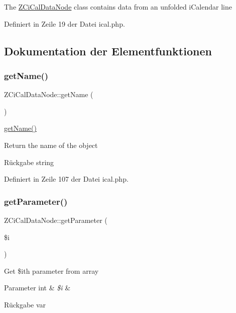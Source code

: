 The \mbox{\hyperlink{class_z_ci_cal_data_node}{Z\+Ci\+Cal\+Data\+Node}} class contains data from an unfolded i\+Calendar line 

Definiert in Zeile 19 der Datei ical.\+php.



\subsection{Dokumentation der Elementfunktionen}
\mbox{\label{class_z_ci_cal_data_node_a59d89d4da6a240fa1b7f0b7b6b40c03f}} 
\subsubsection{\texorpdfstring{get\+Name()}{getName()}}
{\footnotesize\ttfamily Z\+Ci\+Cal\+Data\+Node\+::get\+Name (\begin{DoxyParamCaption}{ }\end{DoxyParamCaption})}

\mbox{\hyperlink{class_z_ci_cal_data_node_a59d89d4da6a240fa1b7f0b7b6b40c03f}{get\+Name()}}

Return the name of the object

\begin{DoxyReturn}{Rückgabe}
string 
\end{DoxyReturn}


Definiert in Zeile 107 der Datei ical.\+php.

\mbox{\label{class_z_ci_cal_data_node_a088ae36c738f279ccddcffdca3e0fd9b}} 
\subsubsection{\texorpdfstring{get\+Parameter()}{getParameter()}}
{\footnotesize\ttfamily Z\+Ci\+Cal\+Data\+Node\+::get\+Parameter (\begin{DoxyParamCaption}\item[{}]{\$i }\end{DoxyParamCaption})}

Get \$ith parameter from array 
\begin{DoxyParams}[1]{Parameter}
int & {\em \$i} & \\
\hline
\end{DoxyParams}
\begin{DoxyReturn}{Rückgabe}
var 
\end{DoxyReturn}


